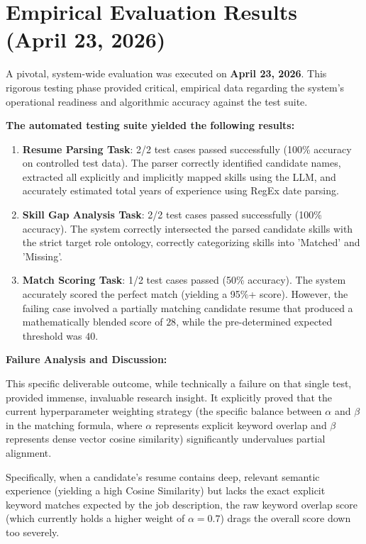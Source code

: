 \documentclass[12pt,a4paper]{report}
\begin{document}
\section{Empirical Evaluation Results (April 23, 2026)}

A pivotal, system-wide evaluation was executed on \textbf{April 23, 2026}. This rigorous testing phase provided critical, empirical data regarding the system's operational readiness and algorithmic accuracy against the test suite.

\textbf{The automated testing suite yielded the following results:}

\begin{enumerate}
    \item \textbf{Resume Parsing Task}: 2/2 test cases passed successfully (100\% accuracy on controlled test data). The parser correctly identified candidate names, extracted all explicitly and implicitly mapped skills using the LLM, and accurately estimated total years of experience using RegEx date parsing.
    \item \textbf{Skill Gap Analysis Task}: 2/2 test cases passed successfully (100\% accuracy). The system correctly intersected the parsed candidate skills with the strict target role ontology, correctly categorizing skills into 'Matched' and 'Missing'.
    \item \textbf{Match Scoring Task}: 1/2 test cases passed (50\% accuracy). The system accurately scored the perfect match (yielding a 95\%+ score). However, the failing case involved a partially matching candidate resume that produced a mathematically blended score of $28$, while the pre-determined expected threshold was $40$. 
\end{enumerate}

\textbf{Failure Analysis and Discussion:}

This specific deliverable outcome, while technically a failure on that single test, provided immense, invaluable research insight. It explicitly proved that the current hyperparameter weighting strategy (the specific balance between $\alpha$ and $\beta$ in the matching formula, where $\alpha$ represents explicit keyword overlap and $\beta$ represents dense vector cosine similarity) significantly undervalues partial alignment. 

Specifically, when a candidate's resume contains deep, relevant semantic experience (yielding a high Cosine Similarity) but lacks the exact explicit keyword matches expected by the job description, the raw keyword overlap score (which currently holds a higher weight of $\alpha = 0.7$) drags the overall score down too severely. 
\end{document}
